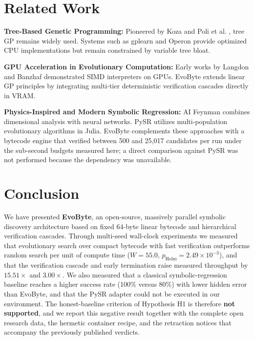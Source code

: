 \documentclass[11pt,a4paper]{article}
\begin{document}
\section{Related Work}
\textbf{Tree-Based Genetic Programming:} Pioneered by Koza \cite{koza1992genetic} and Poli et al. \cite{poli2008field}, tree GP remains widely used. Systems such as gplearn and Operon provide optimized CPU implementations but remain constrained by variable tree bloat.

\textbf{GPU Acceleration in Evolutionary Computation:} Early works by Langdon and Banzhaf \cite{langdon2008simd} demonstrated SIMD interpreters on GPUs. EvoByte extends linear GP principles \cite{miller2000cartesian} by integrating multi-tier deterministic verification cascades directly in VRAM.

\textbf{Physics-Inspired and Modern Symbolic Regression:} AI Feynman \cite{udrescu2020ai} combines dimensional analysis with neural networks. PySR \cite{cranmer2023interpretable} utilizes multi-population evolutionary algorithms in Julia. EvoByte complements these approaches with a bytecode engine that verified between 500 and 25{,}017 candidates per run under the sub-second budgets measured here; a direct comparison against PySR was not performed because the dependency was unavailable.

\section{Conclusion}
We have presented \textbf{EvoByte}, an open-source, massively parallel symbolic discovery architecture based on fixed 64-byte linear bytecode and hierarchical verification cascades. Through multi-seed wall-clock experiments we measured that evolutionary search over compact bytecode with fast verification outperforms random search per unit of compute time ($W = 55.0$, $p_{\text{Holm}} = 2.49 \times 10^{-3}$), and that the verification cascade and early termination raise measured throughput by $15.51\times$ and $3.00\times$. We also measured that a classical symbolic-regression baseline reaches a higher success rate (100\% versus 80\%) with lower hidden error than EvoByte, and that the PySR adapter could not be executed in our environment. The honest-baseline criterion of Hypothesis H1 is therefore \textbf{not supported}, and we report this negative result together with the complete open research data, the hermetic container recipe, and the retraction notices that accompany the previously published verdicts.
\end{document}
